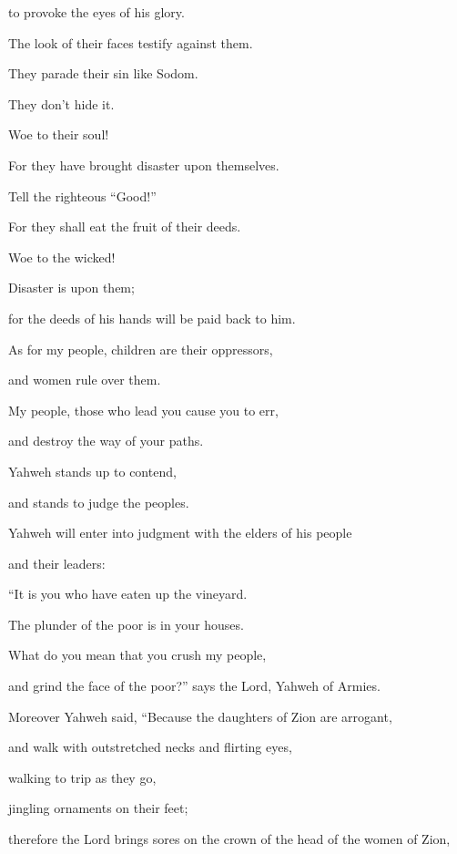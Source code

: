 {\par }{\Q to provoke the eyes of his glory.
\par }{\Q {}The look of their faces testify against them.
\par }{\QB They parade their sin like Sodom.
\par }{\QB They don’t hide it.
\par }{\QB Woe to their soul!
\par }{\QB For they have brought disaster upon themselves.
\par }{\Q {}Tell the righteous “Good!”
\par }{\QB For they shall eat the fruit of their deeds.
\par }{\Q {}Woe to the wicked!
\par }{\QB Disaster is upon them;
\par }{\QB for the deeds of his hands will be paid back to him.
\par }{\Q {}As for my people, children are their oppressors,
\par }{\QB and women rule over them.
\par }{\QB My people, those who lead you cause you to err,
\par }{\QB and destroy the way of your paths.
\par }{\BB \par }{\Q {}Yahweh stands up to contend,
\par }{\QB and stands to judge the peoples.
\par }{\Q {}Yahweh will enter into judgment with the elders of his people
\par }{\QB and their leaders:
\par }{\QB “It is you who have eaten up the vineyard.
\par }{\QB The plunder of the poor is in your houses.
\par }{\QB {}What do you mean that you crush my people,
\par }{\QB and grind the face of the poor?” says the Lord, Yahweh of Armies.
\par }{\BB \par }{\Q {}Moreover Yahweh said, “Because the daughters of Zion are arrogant,
\par }{\QB and walk with outstretched necks and flirting eyes,
\par }{\QB walking to trip as they go,
\par }{\QB jingling ornaments on their feet;
\par }{\Q {}therefore the Lord brings sores on the crown of the head of the women of Zion,
}
